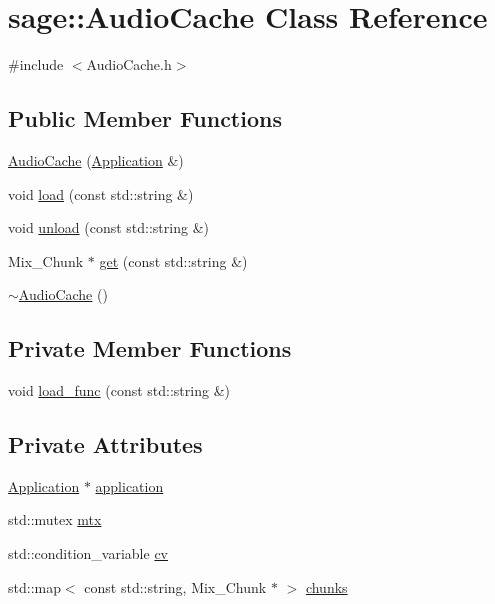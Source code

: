 \hypertarget{classsage_1_1AudioCache}{}\section{sage\+::Audio\+Cache Class Reference}
\label{classsage_1_1AudioCache}


{\ttfamily \#include $<$Audio\+Cache.\+h$>$}

\subsection*{Public Member Functions}
\begin{DoxyCompactItemize}
\item 
\mbox{\hyperlink{classsage_1_1AudioCache_a637030c7f7d4969e9c51563f9cc08062}{Audio\+Cache}} (\mbox{\hyperlink{classsage_1_1Application}{Application}} \&)
\item 
void \mbox{\hyperlink{classsage_1_1AudioCache_aafae5e1d8e31d8beac67b1326f59712a}{load}} (const std\+::string \&)
\item 
void \mbox{\hyperlink{classsage_1_1AudioCache_a91a1bae14653a9f8b085adffdb2dbacf}{unload}} (const std\+::string \&)
\item 
Mix\+\_\+\+Chunk $\ast$ \mbox{\hyperlink{classsage_1_1AudioCache_a2a9ba507b403201dfb9d5d7b85160cb4}{get}} (const std\+::string \&)
\item 
\mbox{\hyperlink{classsage_1_1AudioCache_a83e03cef642e3988abff4846c2b962d3}{$\sim$\+Audio\+Cache}} ()
\end{DoxyCompactItemize}
\subsection*{Private Member Functions}
\begin{DoxyCompactItemize}
\item 
void \mbox{\hyperlink{classsage_1_1AudioCache_a06400f89de15e5db96b8f0cbd27c71e3}{load\+\_\+func}} (const std\+::string \&)
\end{DoxyCompactItemize}
\subsection*{Private Attributes}
\begin{DoxyCompactItemize}
\item 
\mbox{\hyperlink{classsage_1_1Application}{Application}} $\ast$ \mbox{\hyperlink{classsage_1_1AudioCache_a3cacf8c395e216a94065577203ae3a10}{application}}
\item 
std\+::mutex \mbox{\hyperlink{classsage_1_1AudioCache_a94ada12c063660c2fd9a0bc3b27f2bfd}{mtx}}
\item 
std\+::condition\+\_\+variable \mbox{\hyperlink{classsage_1_1AudioCache_a8bf8e2eb17634591e783c20a793c884f}{cv}}
\item 
std\+::map$<$ const std\+::string, Mix\+\_\+\+Chunk $\ast$ $>$ \mbox{\hyperlink{classsage_1_1AudioCache_a0aed8eaeb96481fe7ecceb6b0d05df69}{chunks}}
\end{DoxyCompactItemize}


